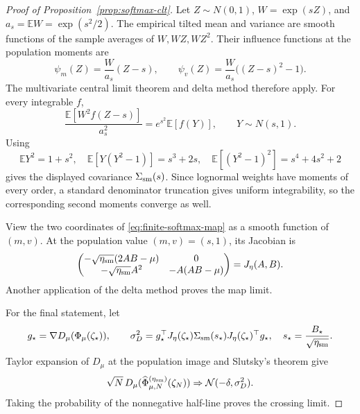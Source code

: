 \documentclass[11pt]{article}
\newcommand{\E}{\mathbb E}
\begin{document}
\begin{proof}[Proof of Proposition~\ref{prop:softmax-clt}]
Let \(Z\sim N(0,1)\), \(W=\exp(sZ)\), and
\(a_s=\E W=\exp(s^2/2)\).  The empirical tilted mean and variance are smooth
functions of the sample averages of \(W,WZ,WZ^2\).  Their influence
functions at the population moments are
\[
\psi_m(Z)=\frac{W}{a_s}(Z-s),\qquad
\psi_v(Z)=\frac{W}{a_s}\bigl((Z-s)^2-1\bigr).
\]
The multivariate central limit theorem and delta method therefore apply.
For every integrable \(f\),
\[
\frac{\E[W^2f(Z-s)]}{a_s^2}
=e^{s^2}\E[f(Y)],
\qquad Y\sim N(s,1).
\]
Using
\[
\E Y^2=1+s^2,\quad
\E[Y(Y^2-1)]=s^3+2s,\quad
\E[(Y^2-1)^2]=s^4+4s^2+2
\]
gives the displayed covariance \(\Sigma_{\rm sm}(s)\).  Since lognormal
weights have moments of every order, a standard denominator truncation
gives uniform integrability, so the corresponding second moments converge as
well.

View the two coordinates of \eqref{eq:finite-softmax-map} as a smooth
function of \((m,v)\).  At the population value
\((m,v)=(s,1)\), its Jacobian is
\[
\begin{pmatrix}
-\sqrt{\eta_{\rm sm}}(2AB-\mu)&0\\
-\sqrt{\eta_{\rm sm}}A^2&-A(AB-\mu)
\end{pmatrix}
=J_\eta(A,B).
\]
Another application of the delta method proves the map limit.

For the final statement, let
\[
g_\star
=\nabla D_\mu(\Phi_\mu(\zeta_\star)),\qquad
\sigma_D^2
=g_\star^\top
J_\eta(\zeta_\star)\Sigma_{\rm sm}(s_\star)
J_\eta(\zeta_\star)^\top g_\star,
\quad
s_\star=\frac{B_\star}{\sqrt{\eta_{\rm sm}}}.
\]
Taylor expansion of \(D_\mu\) at the population image and Slutsky's theorem
give
\[
\sqrt N\,D_\mu(
\widehat\Phi_{\mu,N}^{(\eta_{\rm sm})}(\zeta_N))
\Rightarrow \mathcal N(-\delta,\sigma_D^2).
\]
Taking the probability of the nonnegative half-line proves the crossing
limit.
\end{proof}
\end{document}
